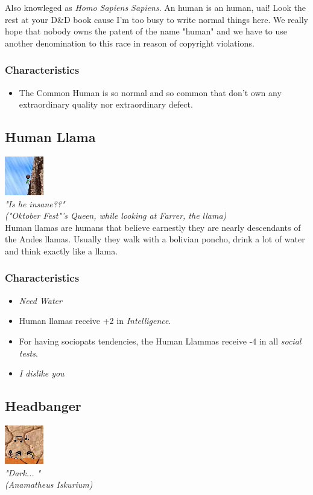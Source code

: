 \documentclass[ letterpaper,12pt]{article}
\begin{document}
Also knowleged as {\it Homo Sapiens Sapiens}. An human is an human, uai! Look
the rest at your D\&D book cause I'm too busy to write normal things here. We
really hope that nobody owns the patent of the name "human" and we have to use
another denomination to this race in reason of copyright violations.

\subsubsection{Characteristics}
\begin{itemize}
\item{The Common Human is so normal and so common that don't own any extraordinary quality nor extraordinary defect.}
\end{itemize}

\subsection{Human Llama}
\includegraphics{../data/races/Img/llama.png}\\
{\it "Is he insane??"\\
("Oktober Fest"'s Queen, while looking at Farrer, the llama)}\\

Human llamas are humans that believe earnestly they are nearly descendants of
the Andes llamas. Usually they walk with a bolivian poncho, drink a lot of
water and think exactly like a llama.

\subsubsection{Characteristics}
\begin{itemize}
\item{\it Need Water}
\item{Human llamas receive +2 in {\it Intelligence}.}
\item{For having sociopats tendencies, the Human Llammas receive -4 in all {\it social tests}.}
\item{{\it I dislike you}}
\end{itemize}

\subsection{Headbanger}
\includegraphics{../data/races/Img/metaleiro.png}\\
{\it "Dark... "\\
(Anamatheus Iskurium)\\}
\end{document}
